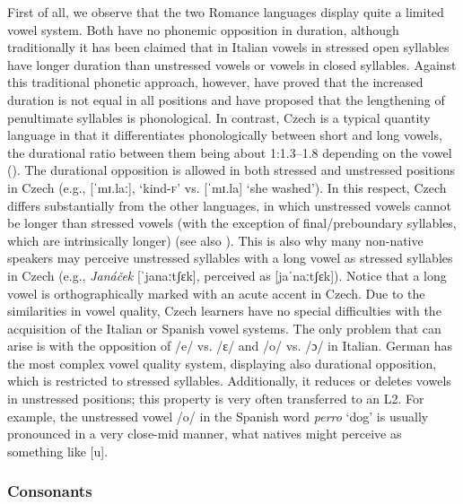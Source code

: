First of all, we observe that the two Romance languages display quite a limited vowel system. Both have no phonemic opposition in duration, although traditionally it has been claimed that in Italian vowels in stressed open syllables have longer duration than unstressed vowels or vowels in closed syllables. Against this traditional phonetic approach, however, \citet{DImperioRosenthall1999} have proved that the increased duration is not equal in all positions and have proposed that the lengthening of penultimate syllables is phonological. In contrast, Czech is a typical quantity language in that it differentiates phonologically between short and long vowels, the durational ratio between them being about 1:1.3--1.8 depending on the vowel (\citealt[51]{SkarnitzlEtAl2016}). The durational opposition is allowed in both stressed and unstressed positions in Czech (e.g., [ˈmɪ.laː], ‘kind-\textsc{f}’ vs. [ˈmɪ.la] ‘she washed’). In this respect, Czech differs substantially from the other languages, in which unstressed vowels cannot be longer than stressed vowels (with the exception of final/preboundary syllables, which are intrinsically longer) (see also ). This is also why many non-native speakers may perceive unstressed syllables with a long vowel as stressed syllables in Czech (e.g., \textit{Janáček} [ˈjanaːtʃɛk], perceived as [jaˈnaːtʃɛk]). Notice that a long vowel is orthographically marked with an acute accent in Czech. Due to the similarities in vowel quality, Czech learners have no special difficulties with the acquisition of the Italian or Spanish vowel systems. The only problem that can arise is with the opposition of /e/ vs. /ɛ/ and /o/ vs. /ɔ/ in Italian. German has the most complex vowel quality system, displaying also durational opposition, which is restricted to stressed syllables. Additionally, it reduces or deletes vowels in unstressed positions; this property is very often transferred to an L2. For example, the unstressed vowel /o/ in the Spanish word \textit{perro} ‘dog’ is usually pronounced in a very close-mid manner, what natives might perceive as something like [u].\pagebreak

\subsubsection{Consonants}\label{sec:2.3.1.2}

